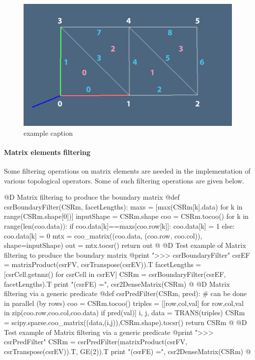 \documentclass[11pt,oneside]{article}	%
\begin{document}
\begin{figure}[htbp] %
   \centering
   \includegraphics[width=0.6\linewidth]{images/2complex} 
   \caption{example caption}
   \label{fig:2complex}
\end{figure}

\paragraph{Matrix elements filtering}

Some filtering operations on matrix elements are needed in the implementation of various topological operators. Some of such filtering operations are given below.

@D Matrix filtering to produce the boundary matrix
@{def csrBoundaryFilter(CSRm, facetLengths):
	maxs = [max(CSRm[k].data) for k in range(CSRm.shape[0])]
	inputShape = CSRm.shape
	coo = CSRm.tocoo()
	for k in range(len(coo.data)):
		if coo.data[k]==maxs[coo.row[k]]: coo.data[k] = 1
		else: coo.data[k] = 0
	mtx = coo_matrix((coo.data, (coo.row, coo.col)), shape=inputShape)
	out = mtx.tocsr()
	return out
@}
@D Test example of Matrix filtering to produce the boundary matrix
@{print "\n>>> csrBoundaryFilter"
csrEF = matrixProduct(csrFV, csrTranspose(csrEV)).T
facetLengths = [csrCell.getnnz() for csrCell in csrEV]
CSRm = csrBoundaryFilter(csrEF, facetLengths).T
print "\ncsrMaxFilter(csrFE) =\n", csr2DenseMatrix(CSRm)
@}
@D Matrix filtering via a generic predicate
@{def csrPredFilter(CSRm, pred):
	# can be done in parallel (by rows)
	coo = CSRm.tocoo()
	triples = [[row,col,val] for row,col,val 
				in zip(coo.row,coo.col,coo.data) if pred(val)]
	i, j, data = TRANS(triples)
	CSRm = scipy.sparse.coo_matrix((data,(i,j)),CSRm.shape).tocsr()
	return CSRm
@}
@D Test example of Matrix filtering via a generic predicate
@{print "\n>>> csrPredFilter"
CSRm = csrPredFilter(matrixProduct(csrFV, csrTranspose(csrEV)).T, GE(2)).T
print "\nccsrPredFilter(csrFE) =\n", csr2DenseMatrix(CSRm)
@}
\end{document}
